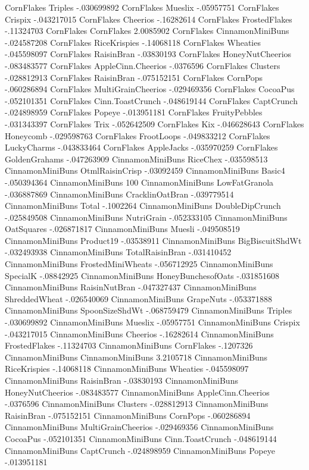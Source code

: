 CornFlakes	Triples	-.030699892
CornFlakes	Mueslix	-.05957751
CornFlakes	Crispix	-.043217015
CornFlakes	Cheerios	-.16282614
CornFlakes	FrostedFlakes	-.11324703
CornFlakes	CornFlakes	2.0085902
CornFlakes	CinnamonMiniBuns	-.024587208
CornFlakes	RiceKrispies	-.14068118
CornFlakes	Wheaties	-.045598097
CornFlakes	RaisinBran	-.03830193
CornFlakes	HoneyNutCheerios	-.083483577
CornFlakes	AppleCinn.Cheerios	-.0376596
CornFlakes	Clusters	-.028812913
CornFlakes	RaisinBran	-.075152151
CornFlakes	CornPops	-.060286894
CornFlakes	MultiGrainCheerios	-.029469356
CornFlakes	CocoaPus	-.052101351
CornFlakes	Cinn.ToastCrunch	-.048619144
CornFlakes	CaptCrunch	-.024898959
CornFlakes	Popeye	-.013951181
CornFlakes	FruityPebbles	-.031343397
CornFlakes	Trix	-.052642509
CornFlakes	Kix	-.046628643
CornFlakes	Honeycomb	-.029598763
CornFlakes	FrootLoops	-.049833212
CornFlakes	LuckyCharms	-.043833464
CornFlakes	AppleJacks	-.035970259
CornFlakes	GoldenGrahams	-.047263909
CinnamonMiniBuns	RiceChex	-.035598513
CinnamonMiniBuns	OtmlRaisinCrisp	-.03092459
CinnamonMiniBuns	Basic4	-.050394364
CinnamonMiniBuns	100%
CinnamonMiniBuns	LowFatGranola	-.036887869
CinnamonMiniBuns	CracklinOatBran	-.039779514
CinnamonMiniBuns	Total	-.1002264
CinnamonMiniBuns	DoubleDipCrunch	-.025849508
CinnamonMiniBuns	NutriGrain	-.052333105
CinnamonMiniBuns	OatSquares	-.026871817
CinnamonMiniBuns	Muesli	-.049508519
CinnamonMiniBuns	Product19	-.03538911
CinnamonMiniBuns	BigBiscuitShdWt	-.032493938
CinnamonMiniBuns	TotalRaisinBran	-.031410452
CinnamonMiniBuns	FrostedMiniWheats	-.056712925
CinnamonMiniBuns	SpecialK	-.08842925
CinnamonMiniBuns	HoneyBunchesofOats	-.031851608
CinnamonMiniBuns	RaisinNutBran	-.047327437
CinnamonMiniBuns	ShreddedWheat	-.026540069
CinnamonMiniBuns	GrapeNuts	-.053371888
CinnamonMiniBuns	SpoonSizeShdWt	-.068759479
CinnamonMiniBuns	Triples	-.030699892
CinnamonMiniBuns	Mueslix	-.05957751
CinnamonMiniBuns	Crispix	-.043217015
CinnamonMiniBuns	Cheerios	-.16282614
CinnamonMiniBuns	FrostedFlakes	-.11324703
CinnamonMiniBuns	CornFlakes	-.1207326
CinnamonMiniBuns	CinnamonMiniBuns	3.2105718
CinnamonMiniBuns	RiceKrispies	-.14068118
CinnamonMiniBuns	Wheaties	-.045598097
CinnamonMiniBuns	RaisinBran	-.03830193
CinnamonMiniBuns	HoneyNutCheerios	-.083483577
CinnamonMiniBuns	AppleCinn.Cheerios	-.0376596
CinnamonMiniBuns	Clusters	-.028812913
CinnamonMiniBuns	RaisinBran	-.075152151
CinnamonMiniBuns	CornPops	-.060286894
CinnamonMiniBuns	MultiGrainCheerios	-.029469356
CinnamonMiniBuns	CocoaPus	-.052101351
CinnamonMiniBuns	Cinn.ToastCrunch	-.048619144
CinnamonMiniBuns	CaptCrunch	-.024898959
CinnamonMiniBuns	Popeye	-.013951181
